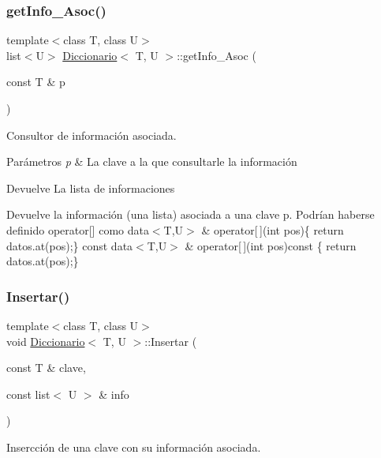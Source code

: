 \subsubsection{\texorpdfstring{get\+Info\+\_\+\+Asoc()}{getInfo\_Asoc()}}
{\footnotesize\ttfamily template$<$class T, class U$>$ \\
list$<$U$>$ \hyperlink{classDiccionario}{Diccionario}$<$ T, U $>$\+::get\+Info\+\_\+\+Asoc (\begin{DoxyParamCaption}\item[{const T \&}]{p }\end{DoxyParamCaption})\hspace{0.3cm}{\ttfamily [inline]}}



Consultor de información asociada. 


\begin{DoxyParams}{Parámetros}
{\em p} & La clave a la que consultarle la información \\
\hline
\end{DoxyParams}
\begin{DoxyReturn}{Devuelve}
La lista de informaciones
\end{DoxyReturn}
Devuelve la información (una lista) asociada a una clave p. Podrían haberse definido operator\mbox{[}\mbox{]} como data$<$\+T,\+U$>$ \& operator\mbox{[}$\,$\mbox{]}(int pos)\{ return datos.\+at(pos);\} const data$<$\+T,\+U$>$ \& operator\mbox{[}$\,$\mbox{]}(int pos)const \{ return datos.\+at(pos);\} \mbox{\label{classDiccionario_af520b73907852cc8002260ddf9fb822c}} 
\subsubsection{\texorpdfstring{Insertar()}{Insertar()}}
{\footnotesize\ttfamily template$<$class T, class U$>$ \\
void \hyperlink{classDiccionario}{Diccionario}$<$ T, U $>$\+::Insertar (\begin{DoxyParamCaption}\item[{const T \&}]{clave,  }\item[{const list$<$ U $>$ \&}]{info }\end{DoxyParamCaption})\hspace{0.3cm}{\ttfamily [inline]}}



Insercción de una clave con su información asociada. 


